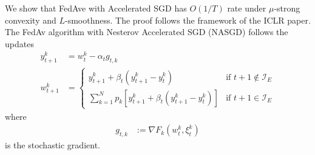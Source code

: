 We show that FedAve with Accelerated SGD has $O(1/T)$ rate under
$\mu$-strong convexity and $L$-smoothness. The proof follows the
framework of the ICLR paper. The FedAv algorithm with Nesterov Accelerated
SGD (NASGD) follows the updates
\begin{align*}
y_{t+1}^{k} & =w_{t}^{k}-\alpha_{t}g_{t,k}\\
w_{t+1}^{k} & =\begin{cases}
y_{t+1}^{k}+\beta_{t}(y_{t+1}^{k}-y_{t}^{k}) & \text{if }t+1\notin\mathcal{I}_{E}\\
\sum_{k=1}^{N}p_{k}\left[y_{t+1}^{k}+\beta_{t}(y_{t+1}^{k}-y_{t}^{k})\right] & \text{if }t+1\in\mathcal{I}_{E}
\end{cases}
\end{align*}
where 
\begin{align*}
g_{t,k} & :=\nabla F_{k}(w_{t}^{k},\xi_{t}^{k})
\end{align*}
is the stochastic gradient. 

